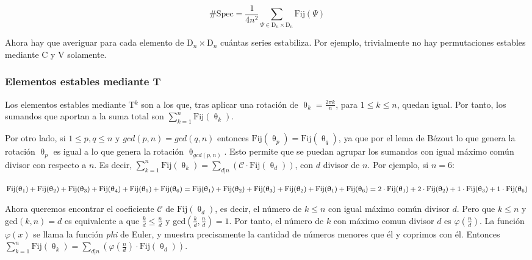 		\[\#\mbox{Spec}=\frac{1}{4n^2}\sum_{\Psi\in\mbox{D}_{n}\times\mbox{D}_{n}}\mbox{Fij}(\Psi)\] 
		
		Ahora hay que averiguar para cada elemento de $\mbox{D}_{n}\times\mbox{D}_{n}$ cuántas series estabiliza. Por ejemplo, trivialmente no hay permutaciones estables mediante C y V solamente.
		
		\subsubsection{Elementos estables mediante T}
		
		Los elementos estables mediante T$^{k}$ son a los que, tras aplicar una rotación de $\uptheta_{k}=\frac{2\pi k}{n}$, para $1\leq k\leq n$, quedan igual. Por tanto, los sumandos que aportan a la suma total son $\sum\limits_{k=1}^{n}\mbox{Fij}(\uptheta_{k})$.
		
		Por otro lado, si $1\leq p,q\leq n$ y $gcd(p,n)=gcd(q,n)$ entonces $\mbox{Fij}(\uptheta_p)=\mbox{Fij}(\uptheta_q)$, ya que por el lema de Bézout lo que genera la rotación $\uptheta_p$ es igual a lo que genera la rotación $\uptheta_{{gcd}(p,n)}$. Esto permite que se puedan agrupar los sumandos con igual máximo común divisor con respecto a $n$. Es decir, $\sum\limits_{k=1}^{n}\mbox{Fij}(\uptheta_{k})=\sum\limits_{d|n}\left(\mathcal{C}\cdot\mbox{Fij}(\uptheta_d)\right)$, con $d$ divisor de $n$.
		Por ejemplo, si $n=6$:
		
		$\mbox{Fij}(\uptheta_{1})+\mbox{Fij}(\uptheta_{2})+\mbox{Fij}(\uptheta_{3})+\mbox{Fij}(\uptheta_{4})+\mbox{Fij}(\uptheta_{5})+\mbox{Fij}(\uptheta_{6})=\\
		\mbox{Fij}(\uptheta_{1})+\mbox{Fij}(\uptheta_{2})+\mbox{Fij}(\uptheta_{3})+\mbox{Fij}(\uptheta_{2})+\mbox{Fij}(\uptheta_{1})+\mbox{Fij}(\uptheta_{6})=\\
		2\cdot\mbox{Fij}(\uptheta_{1})+2\cdot\mbox{Fij}(\uptheta_{2})+1\cdot\mbox{Fij}(\uptheta_{3})+1\cdot\mbox{Fij}(\uptheta_{6})$
		
		Ahora queremos encontrar el coeficiente $\mathcal{C}$ de $\mbox{Fij}(\uptheta_d)$, es decir, el número de $k\leq n$ con igual máximo común divisor $d$. Pero que $k\leq n$ y gcd$(k,n)=d$ es equivalente a que $ \frac{k}{d}\leq\frac{n}{d}$ y gcd$\left(\frac{k}{d},\frac{n}{d}\right)=1$. Por tanto, el número de $k$ con máximo comun divisor $d$ es $\varphi\left(\frac{n}{d}\right)$. La función $\varphi(x)$ se llama la función \textit{phi} de Euler, y muestra precisamente la cantidad de números menores que él y coprimos con él. Entonces $\sum\limits_{{k}=1}^{n}\mbox{Fij}(\uptheta_{{k}})=\sum\limits_{d|n}\left(\varphi(\frac{n}{d})\cdot\mbox{Fij}(\uptheta_d)\right)$.
		
